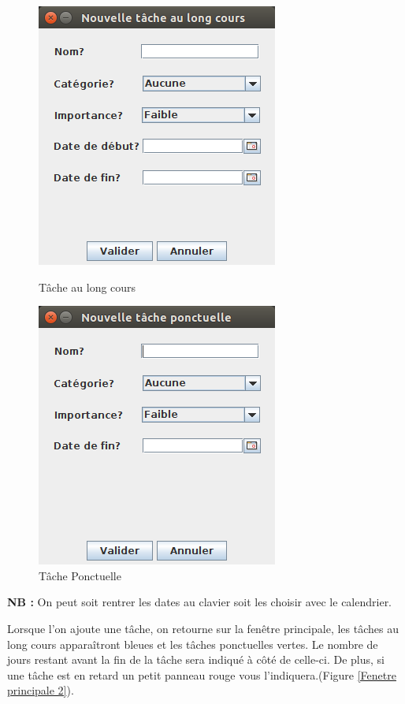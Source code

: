 \documentclass{article}
\begin{document}
\begin{figure}[!ht]
	\centering
	\begin{minipage}[t]{5cm}
		\centering
		\includegraphics [scale=0.34]{images/NewTAsk1.png}
		\caption{Tâche au long cours}
		\label{Tâche au long cours}
	\end{minipage}
	\begin{minipage}[t]{5cm}
		\centering
		\includegraphics [scale=0.34]{images/NewTAsk2.png}
		\caption {Tâche Ponctuelle}
		\label{Tâche Ponctuelle}
	\end{minipage}
\end{figure}

\textbf{NB :} On peut soit rentrer les dates au clavier soit les choisir avec le calendrier.
\newline
\par
 Lorsque l'on ajoute une tâche, on retourne sur la fenêtre principale, les tâches au long cours apparaîtront bleues et les tâches ponctuelles vertes. Le nombre de jours restant avant la fin de la tâche sera indiqué à côté de celle-ci.
De plus, si une tâche est en retard un petit panneau rouge vous l'indiquera.(Figure \ref{Fenetre principale 2}).
\end{document}
